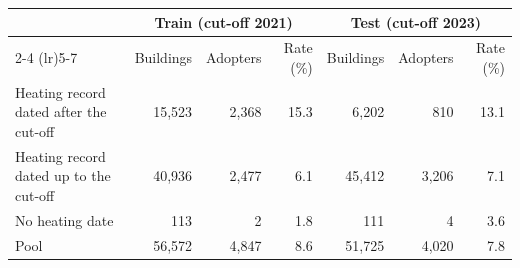 \begin{tabular}{lrrrrrr}
\toprule
 & \multicolumn{3}{c}{Train (cut-off 2021)} & \multicolumn{3}{c}{Test (cut-off 2023)} \\
\cmidrule(lr){2-4} \cmidrule(lr){5-7}
 & Buildings & Adopters & Rate (\%) & Buildings & Adopters & Rate (\%) \\
\midrule
Heating record dated after the cut-off & 15{,}523 & 2{,}368 & 15.3 & 6{,}202 & 810 & 13.1 \\
Heating record dated up to the cut-off & 40{,}936 & 2{,}477 & 6.1 & 45{,}412 & 3{,}206 & 7.1 \\
No heating date & 113 & 2 & 1.8 & 111 & 4 & 3.6 \\
\midrule
Pool & 56{,}572 & 4{,}847 & 8.6 & 51{,}725 & 4{,}020 & 7.8 \\
\bottomrule
\end{tabular}
